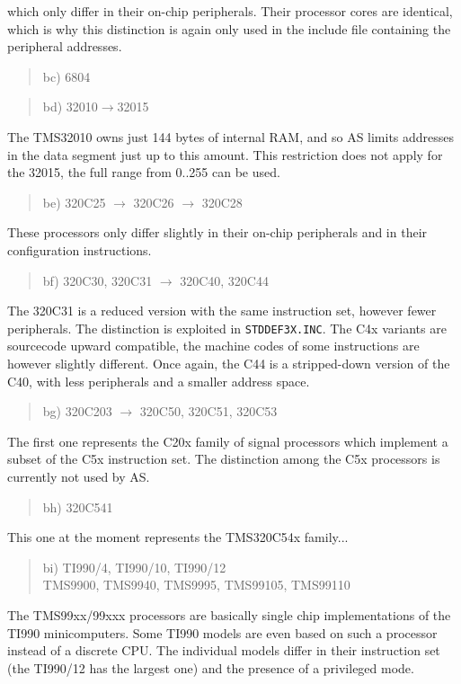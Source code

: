 \documentclass[12pt,twoside]{report}
\newcommand{\tty}[1]{{\tt #1}}
\begin{document}
which only differ in their on-chip peripherals.  Their processor
cores are identical, which is why this distinction is again only used
in the include file containing the peripheral addresses.
\begin{quote}
bc) 6804
\end{quote}
\begin{quote}
bd) 32010$\rightarrow$32015
\end{quote}
The TMS32010 owns just 144 bytes of internal RAM, and so AS limits
addresses in the data segment just up to this amount.  This restriction
does not apply for the 32015, the full range from 0..255 can be used.
\begin{quote}
be) 320C25 $\rightarrow$ 320C26 $\rightarrow$ 320C28
\end{quote}
These processors only differ slightly in their on-chip peripherals
and in their configuration instructions.
\begin{quote}
bf) 320C30, 320C31 $\rightarrow$ 320C40, 320C44
\end{quote}
The 320C31 is a reduced version with the same instruction set,
however fewer peripherals.  The distinction is exploited in
\tty{STDDEF3X.INC}.  The C4x variants are sourcecode upward
compatible, the machine codes of some instructions are however
slightly different.  Once again, the C44 is a stripped-down
version of the C40, with less peripherals and a smaller address
space.
\begin{quote}
bg) 320C203 $\rightarrow$ 320C50, 320C51, 320C53
\end{quote}
The first one represents the C20x family of signal processors which
implement a subset of the C5x instruction set.  The distinction among the
C5x processors is currently not used by AS.
\begin{quote}
bh) 320C541
\end{quote}
This one at the moment represents the TMS320C54x family...
\begin{quote}
bi) TI990/4, TI990/10, TI990/12 \\
    TMS9900, TMS9940, TMS9995, TMS99105, TMS99110
\end{quote}
The TMS99xx/99xxx processors are basically single chip implementations
of the TI990 minicomputers.  Some TI990 models are even based on such
a processor instead of a discrete CPU.  The individual models differ in their
instruction set (the TI990/12 has the largest one) and the presence of a
privileged mode.
\end{document}

